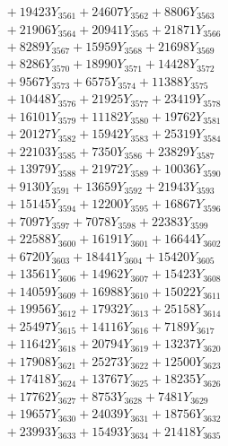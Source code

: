 \documentclass[a4paper,10pt]{article}
\begin{document}
{\begin{align}
&\;  + 19423 Y_{3561} + 24607 Y_{3562} + 8806 Y_{3563} \\[0.3ex]
&\;  + 21906 Y_{3564} + 20941 Y_{3565} + 21871 Y_{3566} \\[0.3ex]
&\;  + 8289 Y_{3567} + 15959 Y_{3568} + 21698 Y_{3569} \\[0.5ex]\allowbreak
&\;  + 8286 Y_{3570} + 18990 Y_{3571} + 14428 Y_{3572} \\[0.3ex]
&\;  + 9567 Y_{3573} + 6575 Y_{3574} + 11388 Y_{3575} \\[0.3ex]
&\;  + 10448 Y_{3576} + 21925 Y_{3577} + 23419 Y_{3578} \\[0.3ex]
&\;  + 16101 Y_{3579} + 11182 Y_{3580} + 19762 Y_{3581} \\[0.3ex]
&\;  + 20127 Y_{3582} + 15942 Y_{3583} + 25319 Y_{3584} \\[0.3ex]
&\;  + 22103 Y_{3585} + 7350 Y_{3586} + 23829 Y_{3587} \\[0.3ex]
&\;  + 13979 Y_{3588} + 21972 Y_{3589} + 10036 Y_{3590} \\[0.3ex]
&\;  + 9130 Y_{3591} + 13659 Y_{3592} + 21943 Y_{3593} \\[0.3ex]
&\;  + 15145 Y_{3594} + 12200 Y_{3595} + 16867 Y_{3596} \\[0.3ex]
&\;  + 7097 Y_{3597} + 7078 Y_{3598} + 22383 Y_{3599} \\[0.5ex]\allowbreak
&\;  + 22588 Y_{3600} + 16191 Y_{3601} + 16644 Y_{3602} \\[0.3ex]
&\;  + 6720 Y_{3603} + 18441 Y_{3604} + 15420 Y_{3605} \\[0.3ex]
&\;  + 13561 Y_{3606} + 14962 Y_{3607} + 15423 Y_{3608} \\[0.3ex]
&\;  + 14059 Y_{3609} + 16988 Y_{3610} + 15022 Y_{3611} \\[0.3ex]
&\;  + 19956 Y_{3612} + 17932 Y_{3613} + 25158 Y_{3614} \\[0.3ex]
&\;  + 25497 Y_{3615} + 14116 Y_{3616} + 7189 Y_{3617} \\[0.3ex]
&\;  + 11642 Y_{3618} + 20794 Y_{3619} + 13237 Y_{3620} \\[0.3ex]
&\;  + 17908 Y_{3621} + 25273 Y_{3622} + 12500 Y_{3623} \\[0.3ex]
&\;  + 17418 Y_{3624} + 13767 Y_{3625} + 18235 Y_{3626} \\[0.3ex]
&\;  + 17762 Y_{3627} + 8753 Y_{3628} + 7481 Y_{3629} \\[0.5ex]\allowbreak
&\;  + 19657 Y_{3630} + 24039 Y_{3631} + 18756 Y_{3632} \\[0.3ex]
&\;  + 23993 Y_{3633} + 15493 Y_{3634} + 21418 Y_{3635} \\[0.3ex]

\end{align}}
\end{document}
